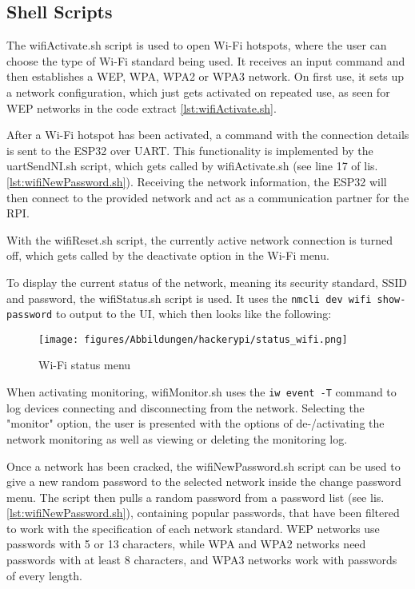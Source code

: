 \subsection{Shell Scripts}

The wifiActivate.sh script is used to open Wi-Fi hotspots, where the user can choose the type of Wi-Fi standard being used. 
It receives an input command and then establishes a WEP, WPA, WPA2 or WPA3 network.
On first use, it sets up a network configuration, which just gets activated on repeated use, as seen for WEP networks in the code extract \ref{lst:wifiActivate.sh}.



After a Wi-Fi hotspot has been activated, a command with the connection details is sent to the ESP32 over UART.
This functionality is implemented by the uartSendNI.sh script, which gets called by wifiActivate.sh (see line 17 of lis. \ref{lst:wifiNewPassword.sh}).
Receiving the network information, the ESP32 will then connect to the provided network and act as a communication partner for the RPI.
    
With the wifiReset.sh script, the currently active network connection is turned off, which gets called by the deactivate option in the Wi-Fi menu.

To display the current status of the network, meaning its security standard, SSID and password, the wifiStatus.sh script is used.
It uses the \lstinline[style=inline]|nmcli dev wifi show-password| to output to the UI, which then looks like the following:

\begin{figure}[h]
    \centering
    \texttt{[image: figures/Abbildungen/hackerypi/status\_wifi.png]}
    \caption{Wi-Fi status menu}
    \label{fig:menu_status}
\end{figure}


When activating monitoring, wifiMonitor.sh uses the \lstinline[style=inline]|iw event -T| command to log devices connecting and disconnecting from the network.
Selecting the "monitor" option, the user is presented with the options of de-/activating the network monitoring as well as viewing or deleting the monitoring log.

Once a network has been cracked, the wifiNewPassword.sh script can be used to give a new random password to the selected network inside the change password menu.
The script then pulls a random password from a password list (see lis. \ref{lst:wifiNewPassword.sh}), containing popular passwords, that have been filtered to work with the specification of each network standard.
WEP networks use passwords with 5 or 13 characters, while WPA and WPA2 networks need passwords with at least 8 characters, and WPA3 networks work with passwords of every length.

